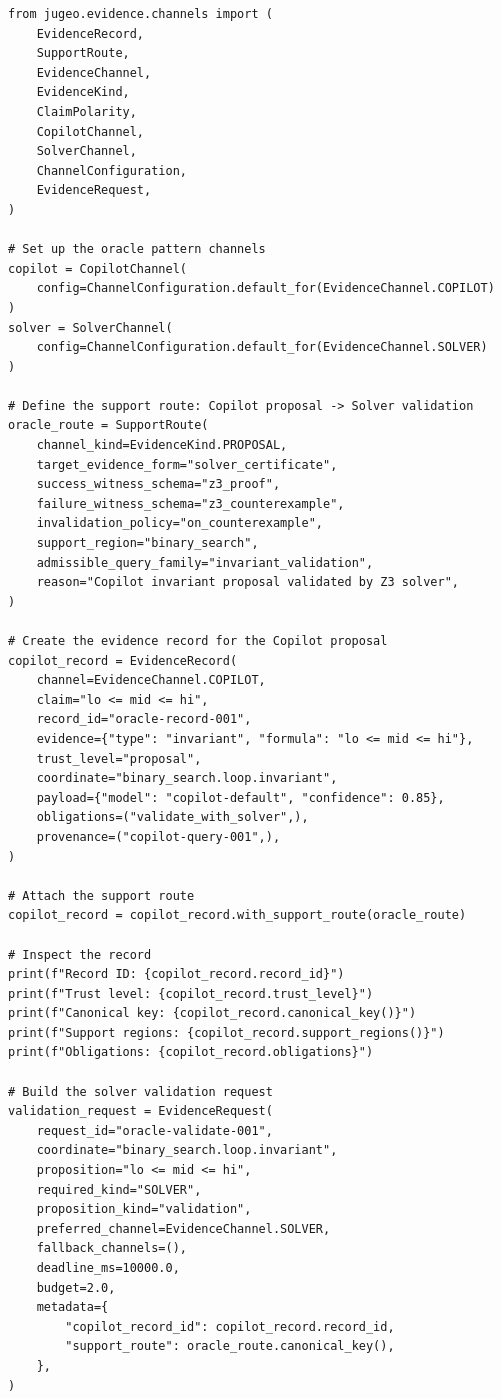 \documentclass[11pt]{article}
\begin{document}
\begin{lstlisting}[style=jugeo-python, caption={Evidence records with support routes for oracle federation.}, label=lst:routes]
from jugeo.evidence.channels import (
    EvidenceRecord,
    SupportRoute,
    EvidenceChannel,
    EvidenceKind,
    ClaimPolarity,
    CopilotChannel,
    SolverChannel,
    ChannelConfiguration,
    EvidenceRequest,
)

# Set up the oracle pattern channels
copilot = CopilotChannel(
    config=ChannelConfiguration.default_for(EvidenceChannel.COPILOT)
)
solver = SolverChannel(
    config=ChannelConfiguration.default_for(EvidenceChannel.SOLVER)
)

# Define the support route: Copilot proposal -> Solver validation
oracle_route = SupportRoute(
    channel_kind=EvidenceKind.PROPOSAL,
    target_evidence_form="solver_certificate",
    success_witness_schema="z3_proof",
    failure_witness_schema="z3_counterexample",
    invalidation_policy="on_counterexample",
    support_region="binary_search",
    admissible_query_family="invariant_validation",
    reason="Copilot invariant proposal validated by Z3 solver",
)

# Create the evidence record for the Copilot proposal
copilot_record = EvidenceRecord(
    channel=EvidenceChannel.COPILOT,
    claim="lo <= mid <= hi",
    record_id="oracle-record-001",
    evidence={"type": "invariant", "formula": "lo <= mid <= hi"},
    trust_level="proposal",
    coordinate="binary_search.loop.invariant",
    payload={"model": "copilot-default", "confidence": 0.85},
    obligations=("validate_with_solver",),
    provenance=("copilot-query-001",),
)

# Attach the support route
copilot_record = copilot_record.with_support_route(oracle_route)

# Inspect the record
print(f"Record ID: {copilot_record.record_id}")
print(f"Trust level: {copilot_record.trust_level}")
print(f"Canonical key: {copilot_record.canonical_key()}")
print(f"Support regions: {copilot_record.support_regions()}")
print(f"Obligations: {copilot_record.obligations}")

# Build the solver validation request
validation_request = EvidenceRequest(
    request_id="oracle-validate-001",
    coordinate="binary_search.loop.invariant",
    proposition="lo <= mid <= hi",
    required_kind="SOLVER",
    proposition_kind="validation",
    preferred_channel=EvidenceChannel.SOLVER,
    fallback_channels=(),
    deadline_ms=10000.0,
    budget=2.0,
    metadata={
        "copilot_record_id": copilot_record.record_id,
        "support_route": oracle_route.canonical_key(),
    },
)


\end{lstlisting}
\end{document}

